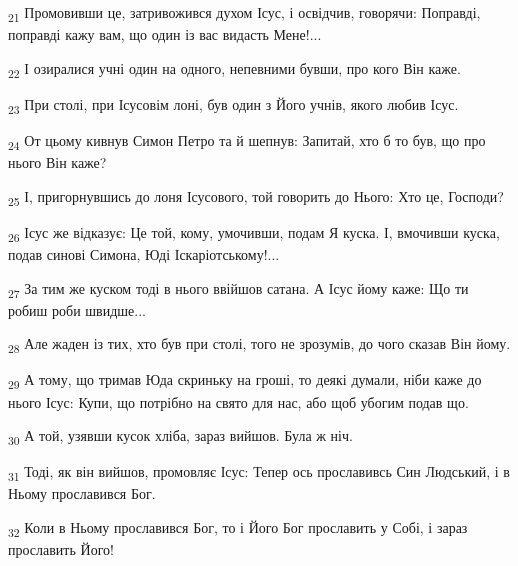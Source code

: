 \begin{tcolorbox}
\textsubscript{21} Промовивши це, затривожився духом Ісус, і освідчив, говорячи: Поправді, поправді кажу вам, що один із вас видасть Мене!...
\end{tcolorbox}
\begin{tcolorbox}
\textsubscript{22} І озиралися учні один на одного, непевними бувши, про кого Він каже.
\end{tcolorbox}
\begin{tcolorbox}
\textsubscript{23} При столі, при Ісусовім лоні, був один з Його учнів, якого любив Ісус.
\end{tcolorbox}
\begin{tcolorbox}
\textsubscript{24} От цьому кивнув Симон Петро та й шепнув: Запитай, хто б то був, що про нього Він каже?
\end{tcolorbox}
\begin{tcolorbox}
\textsubscript{25} І, пригорнувшись до лоня Ісусового, той говорить до Нього: Хто це, Господи?
\end{tcolorbox}
\begin{tcolorbox}
\textsubscript{26} Ісус же відказує: Це той, кому, умочивши, подам Я куска. І, вмочивши куска, подав синові Симона, Юді Іскаріотському!...
\end{tcolorbox}
\begin{tcolorbox}
\textsubscript{27} За тим же куском тоді в нього ввійшов сатана. А Ісус йому каже: Що ти робиш роби швидше...
\end{tcolorbox}
\begin{tcolorbox}
\textsubscript{28} Але жаден із тих, хто був при столі, того не зрозумів, до чого сказав Він йому.
\end{tcolorbox}
\begin{tcolorbox}
\textsubscript{29} А тому, що тримав Юда скриньку на гроші, то деякі думали, ніби каже до нього Ісус: Купи, що потрібно на свято для нас, або щоб убогим подав що.
\end{tcolorbox}
\begin{tcolorbox}
\textsubscript{30} А той, узявши кусок хліба, зараз вийшов. Була ж ніч.
\end{tcolorbox}
\begin{tcolorbox}
\textsubscript{31} Тоді, як він вийшов, промовляє Ісус: Тепер ось прославивсь Син Людський, і в Ньому прославився Бог.
\end{tcolorbox}
\begin{tcolorbox}
\textsubscript{32} Коли в Ньому прославився Бог, то і Його Бог прославить у Собі, і зараз прославить Його!
\end{tcolorbox}
